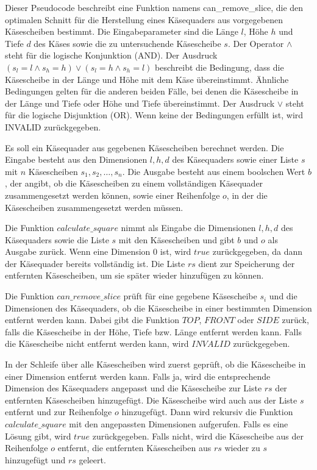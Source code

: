 \documentclass[a4paper,10pt,ngerman]{scrartcl}
\begin{document}
    Dieser Pseudocode beschreibt eine Funktion namens can\_remove\_slice, die den optimalen Schnitt für die Herstellung eines Käsequaders aus vorgegebenen Käsescheiben bestimmt.
    Die Eingabeparameter sind die Länge $l$, Höhe $h$ und Tiefe $d$ des Käses sowie die zu untersuchende Käsescheibe $s$.
    Der Operator $\land$ steht für die logische Konjunktion (AND).
    Der Ausdruck $(s_l = l \land s_h = h) \lor (s_l = h \land s_h = l)$ beschreibt die Bedingung,
    dass die Käsescheibe in der Länge und Höhe mit dem Käse übereinstimmt.
    Ähnliche Bedingungen gelten für die anderen beiden Fälle, bei denen die Käsescheibe in der Länge und Tiefe oder Höhe und Tiefe übereinstimmt.
    Der Ausdruck $\lor$ steht für die logische Disjunktion (OR).
    Wenn keine der Bedingungen erfüllt ist, wird INVALID zurückgegeben.

    Es soll ein Käsequader aus gegebenen Käsescheiben berechnet werden.
    Die Eingabe besteht aus den Dimensionen $l, h, d$ des Käsequaders sowie einer Liste $s$ mit $n$ Käsescheiben $s_1, s_2, \dots, s_n$.
    Die Ausgabe besteht aus einem boolschen Wert $b$, der angibt, ob die Käsescheiben zu einem vollständigen Käsequader zusammengesetzt werden können,
    sowie einer Reihenfolge $o$, in der die Käsescheiben zusammengesetzt werden müssen.

    Die Funktion $calculate\_square$ nimmt als Eingabe die Dimensionen $l, h, d$ des Käsequaders sowie die Liste $s$ mit den Käsescheiben und gibt $b$ und $o$ als Ausgabe zurück.
    Wenn eine Dimension $0$ ist, wird $true$ zurückgegeben, da dann der Käsequader bereits vollständig ist.
    Die Liste $rs$ dient zur Speicherung der entfernten Käsescheiben, um sie später wieder hinzufügen zu können.

    Die Funktion $can\_remove\_slice$ prüft für eine gegebene Käsescheibe $s_i$ und die Dimensionen des Käsequaders, ob die Käsescheibe in einer bestimmten Dimension entfernt werden kann.
    Dabei gibt die Funktion $TOP$, $FRONT$ oder $SIDE$ zurück, falls die Käsescheibe in der Höhe,
    Tiefe bzw.
    Länge entfernt werden kann.
    Falls die Käsescheibe nicht entfernt werden kann, wird $INVALID$ zurückgegeben.

    In der Schleife über alle Käsescheiben wird zuerst geprüft, ob die Käsescheibe in einer Dimension entfernt werden kann.
    Falls ja, wird die entsprechende Dimension des Käsequaders angepasst und die Käsescheibe zur Liste $rs$ der entfernten Käsescheiben hinzugefügt.
    Die Käsescheibe wird auch aus der Liste $s$ entfernt und zur Reihenfolge $o$ hinzugefügt.
    Dann wird rekursiv die Funktion $calculate\_square$ mit den angepassten Dimensionen aufgerufen.
    Falls es eine Lösung gibt, wird $true$ zurückgegeben.
    Falls nicht, wird die Käsescheibe aus der Reihenfolge $o$ entfernt, die entfernten Käsescheiben aus $rs$ wieder zu $s$ hinzugefügt und $rs$ geleert.
\end{document}
